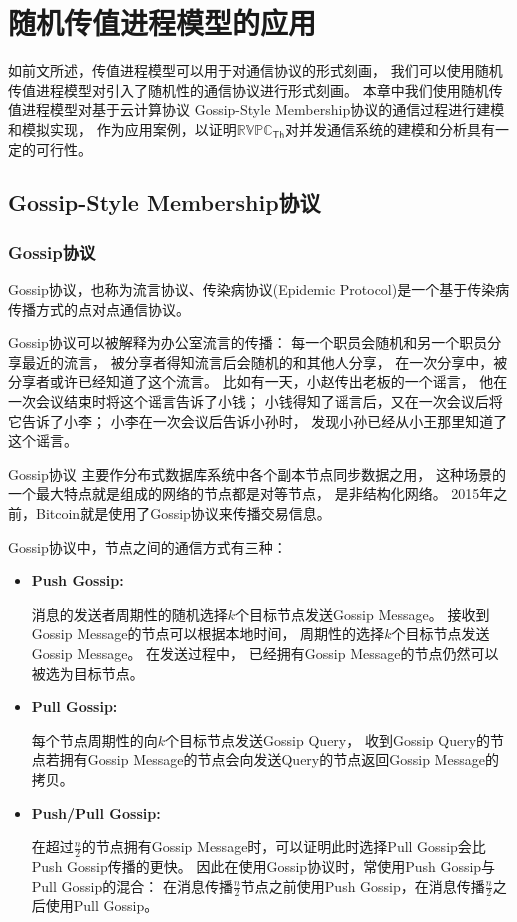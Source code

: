 
\chapter{随机传值进程模型的应用}\label{ch:gossip}

如前文所述，传值进程模型可以用于对通信协议的形式刻画，
我们可以使用随机传值进程模型对引入了随机性的通信协议进行形式刻画。
本章中我们使用随机传值进程模型对基于云计算协议
Gossip-Style Membership协议的通信过程进行建模和模拟实现，
作为应用案例，以证明$\mathbb{RVPC}_{\mathsf{Th}}$对并发通信系统的建模和分析具有一定的可行性。

\section{Gossip-Style Membership协议}
\subsection{Gossip协议}
Gossip协议，也称为流言协议、传染病协议(Epidemic Protocol)是一个基于传染病传播方式的点对点通信协议\cite{Gossip}。

Gossip协议可以被解释为办公室流言的传播：
每一个职员会随机和另一个职员分享最近的流言，
被分享者得知流言后会随机的和其他人分享，
在一次分享中，被分享者或许已经知道了这个流言。
比如有一天，小赵传出老板的一个谣言，
他在一次会议结束时将这个谣言告诉了小钱；
小钱得知了谣言后，又在一次会议后将它告诉了小李；
小李在一次会议后告诉小孙时，
发现小孙已经从小王那里知道了这个谣言。

Gossip协议
主要作分布式数据库系统中各个副本节点同步数据之用，
这种场景的一个最大特点就是组成的网络的节点都是对等节点，
是非结构化网络。
2015年之前，Bitcoin就是使用了Gossip协议来传播交易信息\cite{Bitcoin}。

Gossip协议中，节点之间的通信方式有三种：
\begin{itemize}
   \item {
      \textbf{Push Gossip:} 
      
      消息的发送者周期性的随机选择$k$个目标节点发送Gossip Message。
      接收到Gossip Message的节点可以根据本地时间，
      周期性的选择$k$个目标节点发送Gossip Message。
      在发送过程中，
      已经拥有Gossip Message的节点仍然可以被选为目标节点。
   }
   \item {
      \textbf{Pull Gossip:}

      每个节点周期性的向$k$个目标节点发送Gossip Query，
      收到Gossip Query的节点若拥有Gossip Message的节点会向发送Query的节点返回Gossip Message的拷贝。
   }
   \item {
      \textbf{Push/Pull Gossip:}

      在超过$\frac{n}{2}$的节点拥有Gossip Message时，可以证明此时选择Pull Gossip会比Push Gossip传播的更快\cite{Gossip}。
      因此在使用Gossip协议时，常使用Push Gossip与Pull Gossip的混合：
      在消息传播$\frac{n}{2}$节点之前使用Push Gossip，在消息传播$\frac{n}{2}$之后使用Pull Gossip。
   }
\end{itemize}

